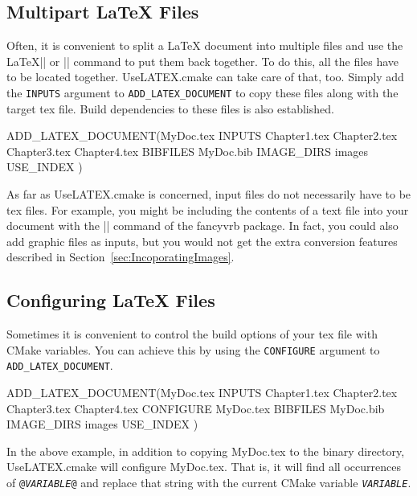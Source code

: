 \documentclass{article}
\newcommand*{\textfile}[1]{\textsf{#1}}
\newcommand*{\textlatexpackage}[1]{\textsf{#1}}
\newcommand*{\textcmake}[1]{\texttt{#1}}
\newcommand*{\textcmakevar}[1]{\textcmake{#1}}
\newcommand*{\textvar}[1]{\textit{#1}}
\newcommand*{\UseLATEX}{\textfile{UseLATEX.cmake}\xspace}
\newcommand*{\latex}{\LaTeX\xspace}
\newcommand*{\ald}{\textcmake{ADD\_LATEX\_DOCUMENT}\xspace}
\begin{document}
  \subsection{Multipart \latex Files}
  \label{sec:MultipartLatexFiles}

  Often, it is convenient to split a \latex document into multiple files
  and use the \latex \textlatex|| or \textlatex|| command to
  put them back together. To do this, all the files have to be located
  together. \UseLATEX can take care of that, too. Simply add the
  \textcmake{INPUTS} argument to \ald to copy these files along with the
  target tex file. Build dependencies to these files is also established.

  \begin{CodeListing}
ADD_LATEX_DOCUMENT(MyDoc.tex
  INPUTS Chapter1.tex Chapter2.tex Chapter3.tex Chapter4.tex
  BIBFILES MyDoc.bib
  IMAGE_DIRS images
  USE_INDEX
  )
  \end{CodeListing}

  As far as \UseLATEX is concerned, input files do not necessarily have to
  be tex files.  For example, you might be including the contents of a text
  file into your document with the \textlatex|\VerbatimInput| command of
  the \textlatexpackage{fancyvrb} package.  In fact, you could also add
  graphic files as inputs, but you would not get the extra conversion
  features described in Section~\ref{sec:IncoporatingImages}.

  \subsection{Configuring \latex Files}
  \label{sec:ConfiguringLatexFiles}

  Sometimes it is convenient to control the build options of your tex file
  with CMake variables. You can achieve this by using the
  \textcmake{CONFIGURE} argument to \ald.

  \begin{CodeListing}
ADD_LATEX_DOCUMENT(MyDoc.tex
  INPUTS Chapter1.tex Chapter2.tex Chapter3.tex Chapter4.tex
  CONFIGURE MyDoc.tex
  BIBFILES MyDoc.bib
  IMAGE_DIRS images
  USE_INDEX
  )
  \end{CodeListing}

  In the above example, in addition to copying \textfile{MyDoc.tex} to the
  binary directory, \UseLATEX will configure \textfile{MyDoc.tex}. That is,
  it will find all occurrences of \textcmake{@\textvar{VARIABLE}@} and
  replace that string with the current CMake variable
  \textcmakevar{\textvar{VARIABLE}}.
\end{document}
